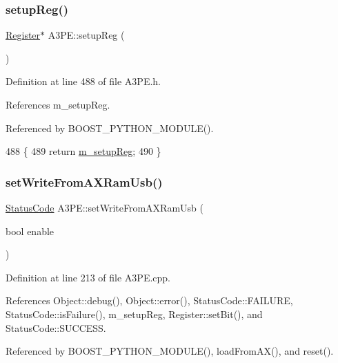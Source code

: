 \subsubsection{\texorpdfstring{setup\+Reg()}{setupReg()}}
{\footnotesize\ttfamily \hyperlink{classRegister}{Register}$\ast$ A3\+P\+E\+::setup\+Reg (\begin{DoxyParamCaption}{ }\end{DoxyParamCaption})\hspace{0.3cm}{\ttfamily [inline]}}



Definition at line 488 of file A3\+P\+E.\+h.



References m\+\_\+setup\+Reg.



Referenced by B\+O\+O\+S\+T\+\_\+\+P\+Y\+T\+H\+O\+N\+\_\+\+M\+O\+D\+U\+L\+E().


\begin{DoxyCode}
488                       \{
489     \textcolor{keywordflow}{return} \hyperlink{classA3PE_a142fa10b7e705c4701ae21678ec2ec8a}{m\_setupReg};
490   \}
\end{DoxyCode}
\mbox{\label{classA3PE_aeb276fae7f19c45b4b4a3a5a2b99c337}} 
\subsubsection{\texorpdfstring{set\+Write\+From\+A\+X\+Ram\+Usb()}{setWriteFromAXRamUsb()}}
{\footnotesize\ttfamily \hyperlink{classStatusCode}{Status\+Code} A3\+P\+E\+::set\+Write\+From\+A\+X\+Ram\+Usb (\begin{DoxyParamCaption}\item[{bool}]{enable }\end{DoxyParamCaption})}



Definition at line 213 of file A3\+P\+E.\+cpp.



References Object\+::debug(), Object\+::error(), Status\+Code\+::\+F\+A\+I\+L\+U\+RE, Status\+Code\+::is\+Failure(), m\+\_\+setup\+Reg, Register\+::set\+Bit(), and Status\+Code\+::\+S\+U\+C\+C\+E\+SS.



Referenced by B\+O\+O\+S\+T\+\_\+\+P\+Y\+T\+H\+O\+N\+\_\+\+M\+O\+D\+U\+L\+E(), load\+From\+A\+X(), and reset().


